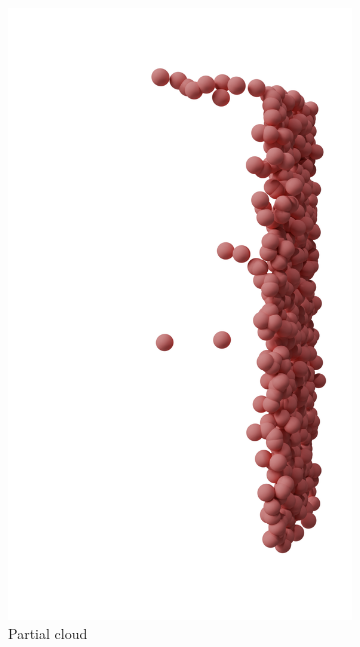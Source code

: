     \begin{figure}[htb]
        \centering
        \begin{subfigure}{0.19\textwidth}
            \includegraphics[width=\linewidth]{figures/inr_cabinet/part_cabi.png}
            \caption{Partial cloud}
        \end{subfigure}
        \hfill
        \begin{subfigure}{0.19\textwidth}

\end{subfigure}
\end{figure}
